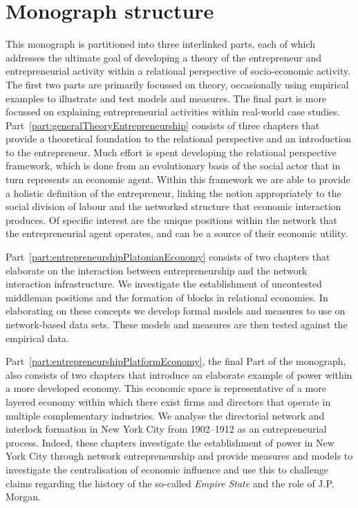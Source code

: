 \section{Monograph structure}

This monograph is partitioned into three interlinked parts, each of which addresses the ultimate goal of developing a theory of the entrepreneur and entrepreneurial activity within a relational perspective of socio-economic activity. The first two parts are primarily focussed on theory, occasionally using empirical examples to illustrate and test models and measures. The final part is more focussed on explaining entrepreneurial activities within real-world case studies. Part~\ref{part:generalTheoryEntrepreneurship} consists of three chapters that provide a theoretical foundation to the relational perspective and an introduction to the entrepreneur. Much effort is spent developing the relational perspective framework, which is done from an evolutionary basis of the social actor that in turn represents an economic agent. Within this framework we are able to provide a holistic definition of the entrepreneur, linking the notion appropriately to the social division of labour and the networked structure that economic interaction produces. Of specific interest are the unique positions within the network that the entrepreneurial agent operates, and can be a source of their economic utility.

Part~\ref{part:entrepreneurshipPlatonianEconomy} consists of two chapters that elaborate on the interaction between entrepreneurship and the network interaction infrastructure. We investigate the establishment of uncontested middleman positions and the formation of blocks in relational economies. In elaborating on these concepts we develop formal models and measures to use on network-based data sets. These models and measures are then tested against the empirical data.

Part~\ref{part:entrepreneurshipPlatformEconomy}, the final Part of the monograph, also consists of two chapters that introduce an elaborate example of power within a more developed economy. This economic space is representative of a more layered economy within which there exist firms and directors that operate in multiple complementary industries. We analyse the directorial network and interlock formation in New York City from 1902--1912 as an entrepreneurial process. Indeed, these chapters investigate the establishment of power in New York City through network entrepreneurship and provide measures and models to investigate the centralisation of economic influence and use this to challenge claims regarding the history of the so-called \emph{Empire State} and the role of J.P. Morgan.

